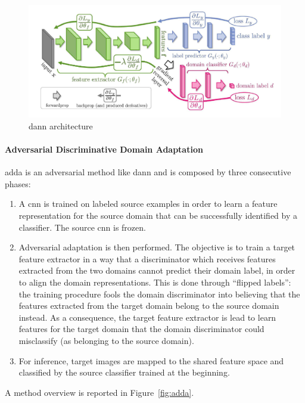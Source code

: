 \documentclass[%
    corpo=12pt,
    twoside,
    stile=classica,   
    tipotesi=magistrale,
    evenboxes,
    english
]{toptesi}
\begin{document}
\begin{figure}[ht!]
	\centering
	\includegraphics[width=0.8\linewidth]{imgs/dann.png}
	\caption{\gls{dann} architecture\cite{ganin2015unsupervised}}
	\label{fig:dann}
\end{figure}


\paragraph{Adversarial Discriminative Domain Adaptation}\label{sec:adda}
\acrshort{adda}\cite{tzeng2017adversarial} is an adversarial method like \gls{dann} and is composed by three consecutive phases:
\begin{enumerate}
	\item A \gls{cnn} is trained on labeled source examples in order to learn a feature representation for the source domain that can be successfully identified by a classifier. The source \gls{cnn} is frozen.
	\item Adversarial adaptation is then performed. The objective is to train a target feature extractor in a way that a discriminator which receives features extracted from the two domains cannot predict their domain label, in order to align the domain representations. This is done through \textquotedblleft flipped labels\textquotedblright : the training procedure fools the domain discriminator into believing that the features ex\-trac\-ted from the target domain belong to the source domain instead. As a consequence, the target feature extractor is lead to learn features for the target domain that the domain discriminator could misclassify (as belonging to the source domain).
	\item For inference, target images are mapped to the shared feature space and classified by the source classifier trained at the beginning.
\end{enumerate}
A method overview is reported in Figure~\ref{fig:adda}.
\end{document}
